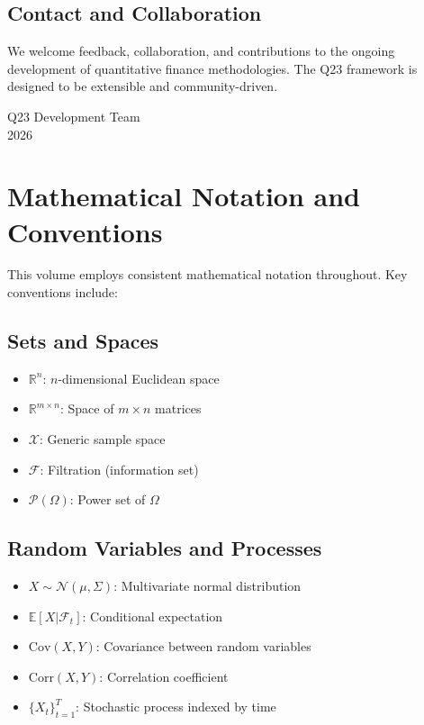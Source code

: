 \documentclass[11pt,letterpaper,openany]{book}
\newcommand{\R}{\mathbb{R}}
\newcommand{\Cov}{\mathrm{Cov}}
\newcommand{\Corr}{\mathrm{Corr}}
\begin{document}
\section*{Contact and Collaboration}

We welcome feedback, collaboration, and contributions to the ongoing development of quantitative finance methodologies. The Q23 framework is designed to be extensible and community-driven.

\begin{flushright}
Q23 Development Team \\
2026
\end{flushright}

\setcounter{tocdepth}{4}

\renewcommand{\contentsname}{\Large\textbf{Mathematical Contents}}
\tableofcontents

\chapter*{Mathematical Notation and Conventions}

This volume employs consistent mathematical notation throughout. Key conventions include:

\section*{Sets and Spaces}
\begin{itemize}
    \item $\R^n$: $n$-dimensional Euclidean space
    \item $\R^{m \times n}$: Space of $m \times n$ matrices
    \item $\mathcal{X}$: Generic sample space
    \item $\mathcal{F}$: Filtration (information set)
    \item $\mathcal{P}(\Omega)$: Power set of $\Omega$
\end{itemize}

\section*{Random Variables and Processes}
\begin{itemize}
    \item $X \sim \mathcal{N}(\mu, \Sigma)$: Multivariate normal distribution
    \item $\mathbb{E}[X|\mathcal{F}_t]$: Conditional expectation
    \item $\Cov(X,Y)$: Covariance between random variables
    \item $\Corr(X,Y)$: Correlation coefficient
    \item $\{X_t\}_{t=1}^T$: Stochastic process indexed by time
\end{itemize}
\end{document}
